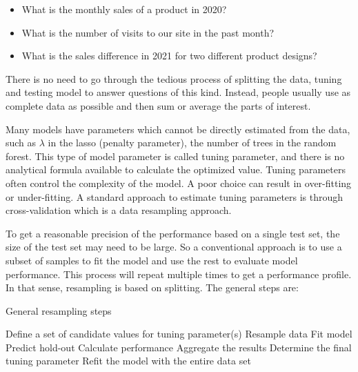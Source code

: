 \documentclass[12pt,]{krantz}
\providecommand{\tightlist}{%
  \setlength{\itemsep}{0pt}\setlength{\parskip}{0pt}}
\begin{document}
\begin{itemize}
\tightlist
\item
  What is the monthly sales of a product in 2020?
\item
  What is the number of visits to our site in the past month?
\item
  What is the sales difference in 2021 for two different product designs?
\end{itemize}

There is no need to go through the tedious process of splitting the data, tuning and testing model to answer questions of this kind. Instead, people usually use as complete data as possible and then sum or average the parts of interest.

Many models have parameters which cannot be directly estimated from the data, such as \(\lambda\) in the lasso (penalty parameter), the number of trees in the random forest. This type of model parameter is called tuning parameter, and there is no analytical formula available to calculate the optimized value. Tuning parameters often control the complexity of the model. A poor choice can result in over-fitting or under-fitting. A standard approach to estimate tuning parameters is through cross-validation which is a data resampling approach.

To get a reasonable precision of the performance based on a single test set, the size of the test set may need to be large. So a conventional approach is to use a subset of samples to fit the model and use the rest to evaluate model performance. This process will repeat multiple times to get a performance profile. In that sense, resampling is based on splitting. The general steps are:

\begin{algorithm}
\caption{General resampling steps}\label{resampling} 
\begin{algorithmic}[1] 
\State Define a set of candidate values for tuning parameter(s)
        \State Resample data
        \State Fit model
        \State Predict hold-out
        \State Calculate performance
    \EndFor
\State Aggregate the results
\State Determine the final tuning parameter
\State Refit the model with the entire data set
\end{algorithmic}
\end{algorithm}
\end{document}
